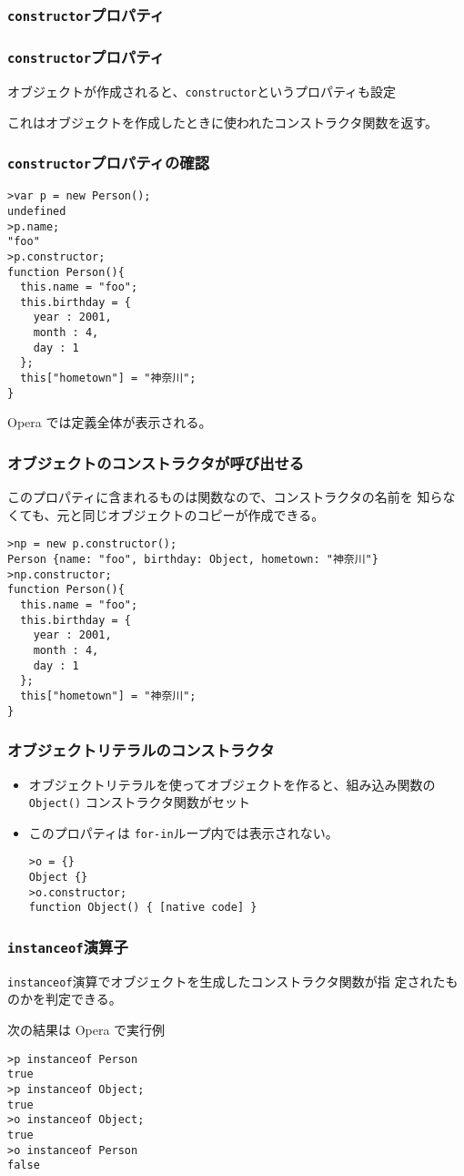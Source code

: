 \subsubsection{\protect\texttt{constructor}プロパティ}
\begin{frame}[containsverbatim]
\frametitle{\protect\texttt{constructor}プロパティ}
オブジェクトが作成されると、\Verb+constructor+というプロパティも設定

これはオブジェクトを作成したときに使われたコンストラクタ関数を返す。
\end{frame}
\begin{frame}[containsverbatim]
\frametitle{\protect\texttt{constructor}プロパティの確認}
\begin{Verbatim}
>var p = new Person();
undefined
>p.name;
"foo"
>p.constructor;
function Person(){
  this.name = "foo";
  this.birthday = {
    year : 2001,
    month : 4,
    day : 1
  };
  this["hometown"] = "神奈川";
}
\end{Verbatim}
Opera では定義全体が表示される。
\end{frame}
\begin{frame}[containsverbatim]
\frametitle{オブジェクトのコンストラクタが呼び出せる}
このプロパティに含まれるものは関数なので、コンストラクタの名前を
       知らなくても、元と同じオブジェクトのコピーが作成できる。
\begin{Verbatim}
>np = new p.constructor();
Person {name: "foo", birthday: Object, hometown: "神奈川"}
>np.constructor;
function Person(){
  this.name = "foo";
  this.birthday = {
    year : 2001,
    month : 4,
    day : 1
  };
  this["hometown"] = "神奈川";
}
\end{Verbatim}
\end{frame}
\begin{frame}[containsverbatim]
\frametitle{オブジェクトリテラルのコンストラクタ}
\begin{itemize}
 \item オブジェクトリテラルを使ってオブジェクトを作ると、組み込み関数の
       \Verb+Object()+ コンストラクタ関数がセット
\item このプロパティは \Verb+for-in+ループ内では表示されない。
\begin{Verbatim}
>o = {}
Object {}
>o.constructor;
function Object() { [native code] }
\end{Verbatim}
\end{itemize}
\end{frame}
\begin{frame}[containsverbatim]
\frametitle{\protect\texttt{instanceof}演算子}
\texttt{instanceof}演算でオブジェクトを生成したコンストラクタ関数が指
定されたものかを判定できる。

次の結果は Opera で実行例
\begin{Verbatim}
>p instanceof Person
true
>p instanceof Object;
true
>o instanceof Object;
true
>o instanceof Person
false
\end{Verbatim}
\end{frame}
\iffalse
